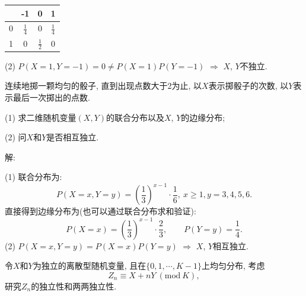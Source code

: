 \documentclass[standard]{ExBook}
\begin{document}
\begin{qitems}
\vspace{-5em}

    \begin{bbox}
\begin{center}
    \renewcommand{\arraystretch}{1.4}
    \setlength{\tabcolsep}{20pt}
    \begin{tabular}{c|c|c|c}
	    \hline
	    \diagbox{$X$}{$P(X,Y)$}{$Y$} & -1 & 0 & 1\\
	    \hline
	    0 & $\displaystyle\frac{1}{4}$ & 0 & $\displaystyle\frac{1}{4}$\\
	    \hline
	    1 & 0 & $\displaystyle\frac{1}{2}$ & 0\\
	    \hline
    \end{tabular}
\end{center}
(2) $P(X=1,Y=-1)=0\neq P(X=1)P(Y=-1)$ $\Longrightarrow$ $X$, $Y$不独立.
    \end{bbox}

\vspace{-5em}

    \begin{bbox}
    \begin{shaded}
        \qitem
连续地掷一颗均匀的骰子, 直到出现点数大于2为止, 以$X$表示掷骰子的次数, 以$Y$表示最后一次掷出的点数.

(1) 求二维随机变量$(X,Y)$的联合分布以及$X$, $Y$的边缘分布;

(2) 问$X$和$Y$是否相互独立.
    \end{shaded}
    \end{bbox}

\vspace{-5em}

    \begin{bbox}
解: 

(1) 联合分布为:
$$P(X=x,Y=y)=\left(\frac{1}{3}\right)^{x-1}\cdot\frac{1}{6},\ x\geq1,y=3,4,5,6.$$
直接得到边缘分布为(也可以通过联合分布求和验证):
$$P(X=x)=\left(\frac{1}{3}\right)^{x-1}\cdot\frac{2}{3},\qquad P(Y=y)=\frac{1}{4}.$$
(2) $P(X=x,Y=y)=P(X=x)P(Y=y)$ $\Longrightarrow$ $X$, $Y$相互独立.
    \end{bbox}

\vspace{-5em}

    \begin{bbox}
    \begin{shaded}
        \qitem
令$X$和$Y$为独立的离散型随机变量, 且在$\{0,1,\cdots,K-1\}$上均匀分布, 考虑
$$Z_n \equiv X+nY\ (\text{mod}\ K),$$
研究$Z_n$的独立性和两两独立性.
    \end{shaded}
    \end{bbox}


\end{qitems}
\end{document}
